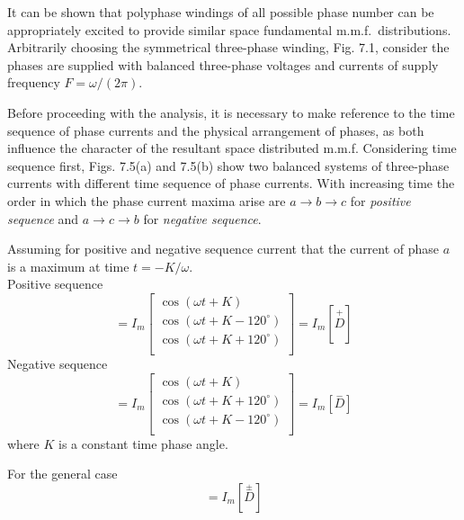 \documentclass[a4paper,numbers=noenddot,12pt]{scrbook}
\begin{document}
    It can be shown that polyphase windings of all possible phase number can be appropriately excited to provide similar space fundamental m.m.f.\ distributions. Arbitrarily choosing the symmetrical three-phase winding, Fig. 7.1, consider the phases are supplied with balanced three-phase voltages and currents of supply frequency $F = \omega /(2\pi)$.

    Before proceeding with the analysis, it is necessary to make reference to the time sequence of phase currents and the physical arrangement of phases, as both influence the character of the resultant space distributed m.m.f. Considering time sequence first, Figs. 7.5(a) and 7.5(b) show two balanced systems of three-phase currents with different time sequence of phase currents. With increasing time the order in which the phase current maxima arise are $a \rightarrow b \rightarrow c$ for \textit{positive
    sequence}  and $a \rightarrow c \rightarrow b$ for \textit{negative sequence}.

    Assuming for positive and negative sequence current that the current of phase $a$ is a maximum at time $t = -K/\omega$.\\
    Positive sequence
    \begin{equation}
        [i_{abc}] = I_m
        \begin{bmatrix}
            \cos (\omega t + K)\\
            \cos (\omega t + K - 120^{\circ}) \\
            \cos (\omega t + K + 120^{\circ}) \\
        \end{bmatrix}
        =
        I_m[\overset{+}{D}]
        \label{eq:Eq7.76}
    \end{equation}
    Negative sequence
    \begin{equation}
        [i_{abc}] = I_m
        \begin{bmatrix}
            \cos (\omega t + K)\\
            \cos (\omega t + K + 120^{\circ}) \\
            \cos (\omega t + K - 120^{\circ}) \\
        \end{bmatrix}
        =
        I_m[\overset{-}{D}]
        \label{eq:Eq7.77}
    \end{equation}
    where $K$ is a constant time phase angle.

    For the general case
    \begin{equation}
        [i_{abc}] = I_m[\overset{\pm}{D}]
        \label{eq:Eq7.78}
    \end{equation}
\end{document}
